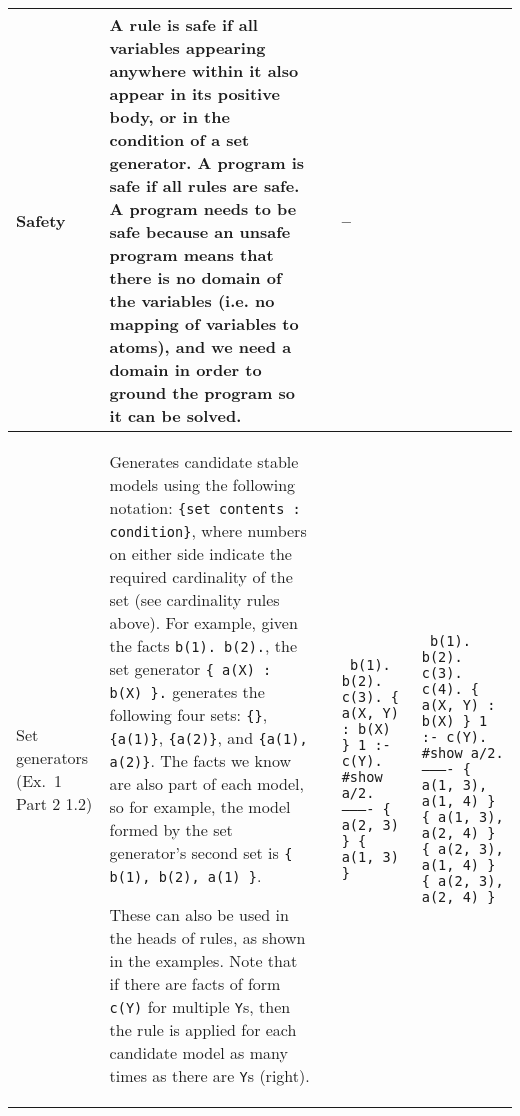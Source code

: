 \documentclass[9pt,a4paper,landscape]{article}
\begin{document}
{\begin{longtable}{Lp{14.5cm}lXX}
Safety
&  A rule is safe if all variables appearing anywhere within it also appear in its positive body, or in the condition of a set generator. 
A program is safe if all rules are safe.
A program needs to be safe because an unsafe program means that there is no domain of the variables (i.e. no mapping of variables to atoms), and we need a domain in order to ground the program so it can be solved.
&& -- &\\ \midrule	

Set generators \newline (Ex.\ 1 Part 2 1.2)
& Generates candidate stable models using the following notation: \texttt{\{set contents : condition\}}, where numbers on either side indicate the required cardinality of the set (see cardinality rules above).
For example, given the facts \texttt{b(1). b(2).}, the set generator \texttt{\{ a(X) : b(X) \}.} generates the following four sets: \texttt{\{\}}, \texttt{\{a(1)\}}, \texttt{\{a(2)\}}, and \texttt{\{a(1), a(2)\}}.
The facts we know are also part of each model, so for example, the model formed by the set generator's second set is \texttt{\{ b(1), b(2), a(1) \}}. \newline

These can also be used in the heads of rules, as shown in the examples. 
Note that if there are facts of form \texttt{c(Y)} for multiple \texttt{Y}s, then the rule is applied for each candidate model as many times as there are \texttt{Y}s (right).

&& {\tiny\texttt{%
		b(1). b(2). c(3).  \{ a(X, Y) : b(X) \} 1 :- c(Y).\newline
		\#show a/2.\newline
		---------- \newline
		\{ a(2, 3) \} \newline
		\{ a(1, 3) \} \newline
}} &
{\tiny\texttt{%
		b(1). b(2). c(3). c(4).  \{ a(X, Y) : b(X) \} 1 :- c(Y).\newline
		\#show a/2.\newline
		---------- \newline
		\{ a(1, 3), a(1, 4) \} \newline
		\{ a(1, 3), a(2, 4) \} \newline
		\{ a(2, 3), a(1, 4) \} \newline
		\{ a(2, 3), a(2, 4) \} \newline
}}
\\ \midrule


\end{longtable}}
\end{document}
